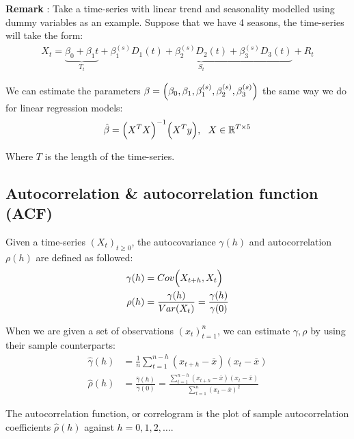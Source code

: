 \textbf{Remark} : Take a time-series with linear trend and seasonality modelled using dummy variables as an example. Suppose that we have 4 seasons, the time-series will take the form:
\begin{align*}
    X_t = \underbrace{\beta_0 + \beta_1t}_{T_t} + \underbrace{\beta_1^{(s)}D_1(t) + \beta_2^{(s)}D_2(t) + \beta_3^{(s)}D_3(t)}_{S_t} + R_t
\end{align*}

\noindent We can estimate the parameters $\beta=\Bigl( \beta_0, \beta_1, \beta^{(s)}_1, \beta^{(s)}_2, \beta^{(s)}_3 \Bigr)$ the same way we do for linear regression models:
\begin{align*}
    \hat\beta = \Bigl(X^TX\Bigr)^{-1} \Bigl(X^Ty\Bigr), \ \ X \in \mathbb{R}^{T\times 5}
\end{align*}

\noindent Where $T$ is the length of the time-series.


\subsection{Autocorrelation \& autocorrelation function (ACF)}
\begin{definition}
    Given a time-series $(X_t)_{t\ge0}$, the autocovariance $\gamma(h)$ and autocorrelation $\rho(h)$ are defined as followed:
    \begin{align*}
        \gamma(h) &= Cov\Bigl(X_{t+h}, X_{t}\Bigr) \\
        \rho(h) &= \frac{\gamma(h)}{Var(X_t)} = \frac{\gamma(h)}{\gamma(0)}
    \end{align*}

    \noindent When we are given a set of observations $(x_t)_{t=1}^n$, we can estimate $\gamma, \rho$ by using their sample counterparts:
    \begin{align*}
        \hat\gamma(h) &= \frac{1}{n}\sum_{t=1}^{n-h}(x_{t+h}-\overline{x})(x_t-\overline{x})
        \\
        \hat\rho(h) &= \frac{\hat\gamma(h)}{\hat\gamma(0)} = \frac{
            \sum_{t=1}^{n-h}(x_{t+h}-\overline{x})(x_t-\overline{x})
        }{
            \sum_{t=1}^n(x_{t}-\overline{x})^2
        }
    \end{align*}
\end{definition}

\begin{definition}
    The autocorrelation function, or correlogram is the plot of sample autocorrelation coefficients $\hat\rho(h)$ against $h=0,1,2,\dots$.
\end{definition}
